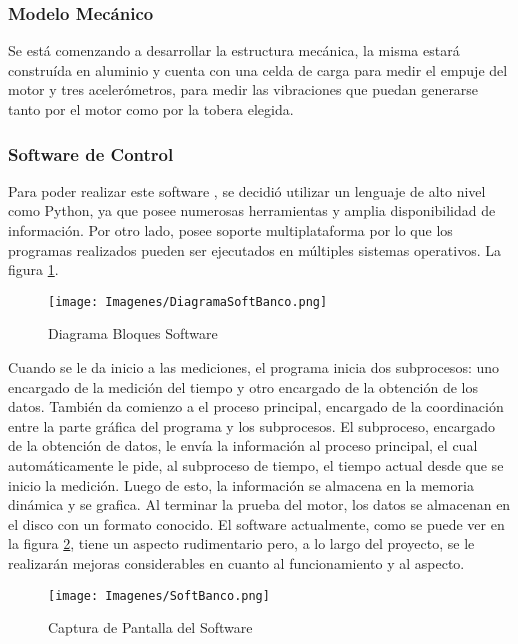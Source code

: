\documentclass[a4paper]{article} %
\begin{document}
\subsubsection{Modelo Mecánico}
Se está comenzando a desarrollar la estructura mecánica, la misma estará construída en aluminio y cuenta con una celda de carga para medir el empuje del motor y tres acelerómetros, para medir las vibraciones que puedan generarse tanto por el motor como por la tobera elegida.

\subsubsection{Software de Control}
Para poder realizar este software , se decidió utilizar un lenguaje de alto nivel como Python, ya que posee numerosas herramientas y amplia disponibilidad de información. Por otro lado, posee soporte multiplataforma por lo que los programas realizados pueden ser ejecutados en múltiples sistemas operativos. La figura \ref{fig:BloquesSoftBanco}.
\begin{figure}[!h]
  \centering
    \texttt{[image: Imagenes/DiagramaSoftBanco.png]}
  \caption{Diagrama Bloques Software}
  \label{fig:BloquesSoftBanco}
\end{figure}
Cuando se le da inicio a las mediciones, el programa inicia dos subprocesos: uno encargado de la medición del tiempo y otro encargado de la obtención de los datos. También da comienzo a el proceso principal, encargado de la coordinación entre la parte gráfica del programa y los subprocesos. El subproceso, encargado de la obtención de datos, le envía la información al proceso principal, el cual automáticamente le pide, al subproceso de tiempo, el tiempo actual desde que se inicio la medición. Luego de esto, la información se almacena en la memoria dinámica y se grafica. Al terminar la prueba del motor, los datos se almacenan en el disco con un formato conocido.
El software actualmente, como se puede ver en la figura \ref{fig:SoftBanco}, tiene un aspecto rudimentario pero, a lo largo del proyecto, se le realizarán mejoras considerables en cuanto al funcionamiento y al aspecto.
\begin{figure}[!h]
  \centering
    \texttt{[image: Imagenes/SoftBanco.png]}
  \caption{Captura de Pantalla del Software}
  \label{fig:SoftBanco}
\end{figure}
\end{document}
